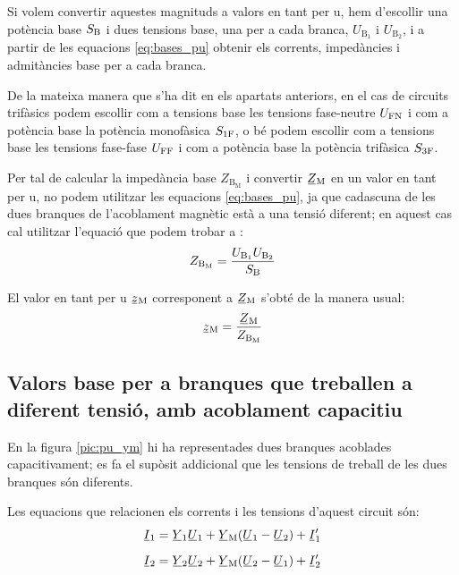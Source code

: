 Si volem convertir aquestes magnituds a valors en tant per u, hem d'escollir  una potència base $S_\mathrm{B}$ i dues tensions base, una  per a cada branca, $U_{\text{B}_1}$ i  $U_{\text{B}_2}$, i a partir de les equacions \eqref{eq:bases_pu} obtenir els corrents, impedàncies i admitàncies base per a cada branca.

De la mateixa manera que s'ha dit en els apartats anteriors, en el cas de circuits trifàsics podem escollir com a tensions base les tensions fase-neutre $U_\mathrm{FN}$ i com a potència base la potència  monofàsica $S_\mathrm{1F}$, o bé podem escollir com a tensions base les tensions fase-fase $U_\mathrm{FF}$ i com a potència base la potència trifàsica $S_\mathrm{3F}$.


Per tal de calcular la impedància base $Z_{\text{B}_\text{M}}$ i convertir $\cmplx{Z}\ped{M}$ en un valor en tant per u, no podem utilitzar les equacions \eqref{eq:bases_pu}, ja que cadascuna de les dues branques de l'acoblament magnètic està a una tensió diferent; en aquest cas cal utilitzar l'equació que podem trobar a \cite{TLE}:
\begin{equation}
    Z_{\text{B}_\text{M}} = \frac{U_{\text{B}_1} U_{\text{B}_2}} {S_\mathrm{B}}
\end{equation}

El valor en tant per u $\cmplx{z}\ped{M}$ corresponent a $\cmplx{Z}\ped{M}$ s'obté de la manera usual:
\begin{equation}
    \cmplx{z}\ped{M} = \frac{\cmplx{Z}\ped{M}}{Z_{\text{B}_\text{M}}}
\end{equation}


\subsection{Valors base per a branques que treballen a diferent tensió, amb acoblament capacitiu}

En la figura \vref{pic:pu_ym} hi ha representades dues branques acoblades capacitivament; es fa el supòsit addicional que les tensions de treball de les dues branques són diferents.

\begin{center}
    
    \label{pic:pu_ym}
\end{center}

Les equacions que relacionen els corrents i les tensions d'aquest circuit són:
\begin{subequations}
\begin{align}
    \cmplx{I}_1  &= \cmplx{Y}_1 \cmplx{U}_1 +  \cmplx{Y}\ped{M}(\cmplx{U}_1-\cmplx{U}_2)  + \cmplx{I}'_1   \\[2mm]
    \cmplx{I}_2  &= \cmplx{Y}_2 \cmplx{U}_2 +  \cmplx{Y}\ped{M}(\cmplx{U}_2-\cmplx{U}_1)  + \cmplx{I}'_2
\end{align}
\end{subequations}

